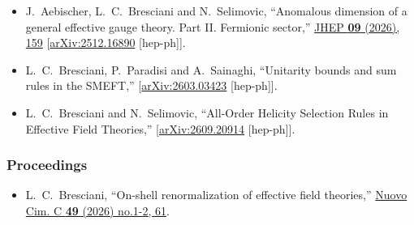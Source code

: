 \begin{itemize}[leftmargin=*]
\item[\cite{Aebischer:2025ddl}]
J.~Aebischer, L.~C.~Bresciani and N.~Selimovic,
``Anomalous dimension of a general effective gauge theory. Part II. Fermionic sector,''
\href{https://doi.org/10.1007/JHEP09(2026)159}{JHEP \textbf{09} (2026), 159}
[\href{https://doi.org/10.48550/arXiv.2512.16890}{arXiv:2512.16890} [hep-ph]].

\item[\cite{Bresciani:2026acy}]
L.~C.~Bresciani, P.~Paradisi and A.~Sainaghi,
``Unitarity bounds and sum rules in the SMEFT,''
[\href{https://doi.org/10.48550/arXiv.2603.03423}{arXiv:2603.03423} [hep-ph]].

\item[\cite{Bresciani:2026yuw}]
L.~C.~Bresciani and N.~Selimovic,
``All-Order Helicity Selection Rules in Effective Field Theories,''
[\href{https://doi.org/10.48550/arXiv.2609.20914}{arXiv:2609.20914} [hep-ph]].

\end{itemize}


\subsubsection{Proceedings}

\begin{itemize}[leftmargin=*]
    \item[\cite{Bresciani:2026rir}]
L.~C.~Bresciani,
``On-shell renormalization of effective field theories,''
\href{https://doi.org/10.1393/ncc/i2026-26061-0}{Nuovo Cim. C \textbf{49} (2026) no.1-2, 61}.
\end{itemize}